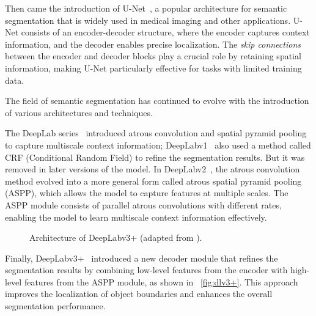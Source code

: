Then came the introduction of U-Net~\cite{fsss_unet}, a popular architecture for semantic segmentation that is widely used in medical imaging and other applications. U-Net consists of an encoder-decoder structure, where the encoder captures context information, and the decoder enables precise localization. The \emph{skip connections} between the encoder and decoder blocks play a crucial role by retaining spatial information, making U-Net particularly effective for tasks with limited training data.

The field of semantic segmentation has continued to evolve with the introduction of various architectures and techniques.

The DeepLab series~\cite{fsss_deeplabv1, fsss_deeplabv2, fsss_deeplabv3,fsss_deeplabv3plus} introduced atrous convolution and spatial pyramid pooling to capture multiscale context information; DeepLabv1~\cite{fsss_deeplabv1} also used a method called CRF (Conditional Random Field) to refine the segmentation results. But it was removed in later versions of the model. In DeepLabv2~\cite{fsss_deeplabv2}, the atrous convolution method evolved into a more general form called atrous spatial pyramid pooling (ASPP), which allows the model to capture features at multiple scales. The ASPP module consists of parallel atrous convolutions with different rates, enabling the model to learn multiscale context information effectively.

\begin{figure}[htbp]
    \centering
    \caption{Architecture of DeepLabv3+ (adapted from \cite{fsss_deeplabv3plus}).}
    \label{fig:dlv3+}
\end{figure}

Finally, DeepLabv3+~\cite{fsss_deeplabv3plus} introduced a new decoder module that refines the segmentation results by combining low-level features from the encoder with high-level features from the ASPP module, as shown in ~\autoref{fig:dlv3+}. This approach improves the localization of object boundaries and enhances the overall segmentation performance.

